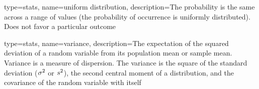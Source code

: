 {
	type=stats,
	name=uniform distribution,
	description={The probability is the same across a range of values (the probability of occurrence is uniformly distributed).  Does not favor a particular outcome}
}

{
	type=stats,
	name=variance,
	description={The expectation of the squared deviation of a random variable from its population mean or sample mean. Variance is a measure of dispersion.  The variance is the square of the standard deviation ($\mbox{$\sigma$}^2$ or $\mbox{$s$}^2$), the second central moment of a distribution, and the covariance of the random variable with itself}
} 